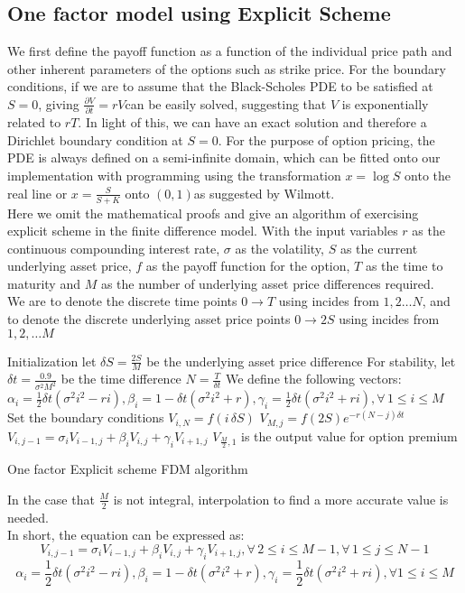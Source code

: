 \subsection{One factor model using Explicit Scheme}
We first define the payoff function as a function of the individual price path and other inherent parameters of the options such as strike price. For the boundary conditions, if we are to assume that the Black-Scholes PDE to be satisfied at $S = 0$, giving $\frac{\partial V}{\partial t} = rV$can be easily solved, suggesting that $V$ is exponentially related to $rT$. In light of this, we can have an exact solution and therefore a Dirichlet boundary condition at $S = 0$. For the purpose of option pricing, the PDE is always defined on a semi-infinite domain, which can be fitted onto our implementation with programming using the transformation $x = \log{S}$ onto the real line or $x = \frac{S}{S+K}$ onto $(0, 1)$as suggested by Wilmott.\\
Here we omit the mathematical proofs and give an algorithm of exercising explicit scheme in the finite difference model. With the input variables $r$ as the continuous compounding interest rate, $\sigma$ as the volatility, $S$ as the current underlying asset price, $f$ as the payoff function for the option, $T$ as the time to maturity and $M$ as the number of underlying asset price differences required.\\
We are to denote the discrete time points $0 \to T$ using incides from $1,2 \dots N$, and to denote the discrete underlying asset price points $0 \to 2S$ using incides from $1,2, \dots M$\\[2mm]
\begin{algorithm}[H]
 Initialization\;
 let $\delta S = \frac{2S}{M}$ be the underlying asset price difference \;
 For stability, let $\delta t = \frac{0.9}{\sigma^{2}M^{2}}$ be the time difference\;
 $N = \frac{T}{\delta t}$\;
 We define the following vectors:\\
 $\alpha_{i} = \frac{1}{2}\delta t(\sigma^{2}i^{2} - ri), \beta_{i} = 1-\delta t(\sigma^{2}i^{2} + r), \gamma_{i} = \frac{1}{2}\delta t(\sigma^{2}i^{2} + ri), \forall \, 1 \le i \le M$\;
 Set the boundary conditions\;
  {
  $V_{i, N} = f(i\,\delta S)$\;
 }
  {
  $V_{M, j} = f(2S)e^{-r(N-j)\delta t}$\;
 }
  {
   {
   $V_{i, j-1} = \sigma_{i}V_{i-1,j} + \beta_{i}V_{i,j} + \gamma_{i}V_{i+1,j} $\;
  }
 }
 $V_{\frac{M}{2},1}$ is the output value for option premium\;
\caption{One factor Explicit scheme FDM algorithm}
\end{algorithm}
In the case that $\frac{M}{2}$ is not integral, interpolation to find a more accurate value is needed.\\[1mm]
In short, the equation can be expressed as:
$$V_{i, j-1} = \sigma_{i}V_{i-1,j} + \beta_{i}V_{i,j} + \gamma_{i}V_{i+1,j},  \forall \,2 \le i \le M-1, \forall \,1 \le j \le N-1$$
$$\alpha_{i} = \frac{1}{2}\delta t(\sigma^{2}i^{2} - ri), \beta_{i} = 1-\delta t(\sigma^{2}i^{2} + r), \gamma_{i} = \frac{1}{2}\delta t(\sigma^{2}i^{2} + ri), \forall 1 \le i \le M$$
\newpage
